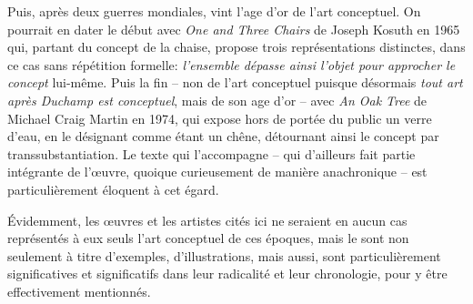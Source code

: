 \documentclass{article}
\begin{document}
Puis, après deux guerres mondiales, vint l'age d'or de l'art conceptuel. On pourrait en dater le début avec \textit{One and Three Chairs} de Joseph Kosuth en 1965 qui, partant du concept de la chaise, propose trois représentations distinctes, dans ce cas sans répétition formelle: \textit{l’ensemble dépasse ainsi l’objet pour approcher le concept} lui-même. 
Puis la fin -- non de l'art conceptuel puisque désormais \textit{tout art après Duchamp est conceptuel}, mais de son age d'or -- avec \textit{An Oak Tree} de Michael Craig Martin en 1974, qui expose hors de portée du public un verre d'eau, en le désignant comme étant un chêne, détournant ainsi le concept par transsubstantiation. Le texte qui l'accompagne -- qui d'ailleurs fait partie intégrante de l'œuvre, quoique curieusement de manière anachronique -- est particulièrement éloquent à cet égard.  

Évidemment, les œuvres et les artistes cités ici ne seraient en aucun cas représentés à eux seuls l'art conceptuel de ces époques, mais le sont non seulement à titre d'exemples, d'illustrations, mais aussi, sont particulièrement significatives et significatifs dans leur radicalité et leur chronologie, pour y être effectivement mentionnés.
\end{document}
